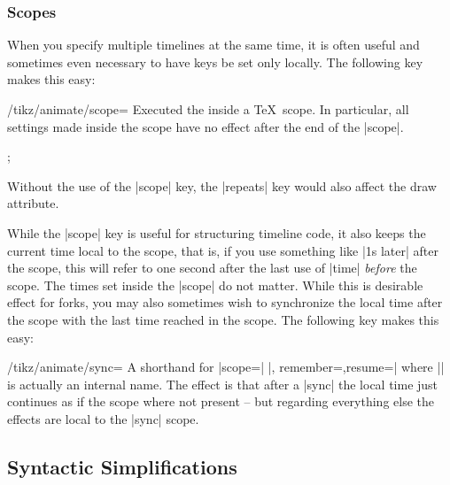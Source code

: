 \subsubsection{Scopes}
\label{section-anim-scopes}

When you specify multiple timelines at the same time, it is often useful and
sometimes even necessary to have keys be set only locally. The following key
makes this easy:

\begin{key}{/tikz/animate/scope=}
    Executed the  inside a \TeX\ scope. In particular, all
    settings made inside the scope have no effect after the end of the |scope|.
\begin{codeexample}[imagesource={standalone/pgfmanual-en-tikz-animations-animation-15.svg}]
\tikz {};
\end{codeexample}

    Without the use of the |scope| key, the |repeats| key would also affect the
    draw attribute.
\end{key}

While the |scope| key is useful for structuring timeline code, it also keeps
the current time local to the scope, that is, if you use something like
|1s later| after the scope, this will refer to one second after the last use of
|time| \emph{before} the scope. The times set inside the |scope| do not matter.
While this is desirable effect for forks, you may also sometimes wish to
synchronize the local time after the scope with the last time reached in the
scope. The following key makes this easy:

\begin{key}{/tikz/animate/sync=}
    A shorthand for |scope={|  |, remember=\temp},resume=\temp|
    where |\temp| is actually an internal name. The effect is that after a
    |sync| the local time just continues as if the scope where not present --
    but regarding everything else the effects are local to the |sync| scope.
\end{key}


\subsection{Syntactic Simplifications}
\label{section-anim-syntax-animate}

